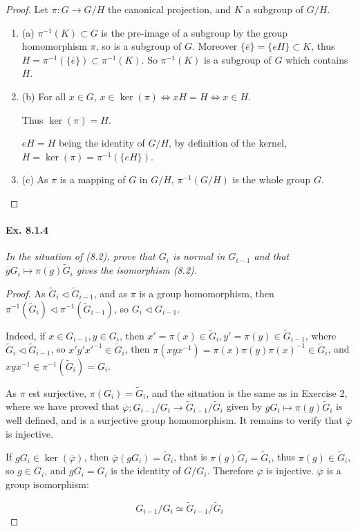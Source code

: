 \documentclass[11pt,a4paper]{article}
\newcommand{\be} {\begin{enumerate}}
\newcommand{\ee} {\end{enumerate}}
\begin{document}
\begin{proof}
Let $\pi : G \to G/H$ the canonical projection, and $K$ a subgroup of $G/H$.


\be
\item[(a)] $\pi^{-1}(K) \subset G$ is the pre-image of  a subgroup by  the group homomorphism $\pi$, so is a subgroup of $G$.
Moreover $\{\overline{e}\} = \{eH\} \subset K$, thus $H = \pi^{-1}(\{\overline{e}\}) \subset \pi^{-1}(K)$. So $\pi^{-1}(K)$ is a subgroup of $G$ which contains $H$.


\item[(b)] For all $x\in G$, $x \in \ker(\pi) \iff xH = H \iff x \in H$.

Thus $\ker(\pi) = H$.

$eH=H$ being the identity of $G/H$, by definition of the kernel, $H = \ker(\pi) = \pi^{-1}(\{eH\})$.

\item[(c)] As $\pi$ is a mapping of $G$ in $G/H$, $\pi^{-1}(G/H)$ is the whole group $G$.
\ee
\end{proof}

\paragraph{Ex. 8.1.4}

{\it In the situation of (8.2), prove that $G_i$ is normal in $G_{i-1}$ and that ${gG_i \mapsto \pi(g) \tilde{G}_i}$ gives the isomorphism (8.2).
}

\begin{proof}
As $\tilde{G}_i \lhd \tilde{G}_{i-1}$, and as $\pi$ is a group homomorphism, then  $\pi^{-1} (\tilde{G}_i) \lhd \pi^{-1} (\tilde{G}_{i-1})$, so $G_{i} \lhd G_{i-1}$.

Indeed, if $x \in G_{i-1}, y \in G_{i}$, then $x' = \pi(x) \in \tilde{G}_i,y' =\pi(y) \in \tilde{G}_{i-1}$, where $\tilde{G}_i \lhd \tilde{G}_{i-1}$, so $x' y' x'^{-1} \in \tilde{G}_i$, 
then $\pi(xyx^{-1}) = \pi(x) \pi(y) \pi(x)^{-1} \in \tilde{G}_{i}$, and $xyx^{-1} \in \pi^{-1}(\tilde{G}_i) = G_i$.


As $\pi$ est surjective, $\pi(G_i) = \tilde{G}_i$, and the situation is the same as in Exercise 2, where we have proved that $\overline{\varphi} : G_{i-1}/G_{i} \to \tilde G_{i-1}/ \tilde G_{i}$ given by $gG_i \mapsto \pi(g) \tilde{G}_i$ is well defined, and is a surjective group homomorphism. It remains to verify that $\overline{\varphi}$ is injective.

If $g G_i \in \ker(\overline{\varphi})$, then $\overline{\varphi}(gG_i) = \tilde G_i$, that is $\pi(g) \tilde G_i = \tilde G_i$, thus $\pi(g) \in \tilde G_i$, so  $g \in G_i$, and $gG_i =G_i$ is the identity of $G/G_i$. Therefore $\overline{\varphi}$ is injective. $\overline{\varphi}$ is a group isomorphism:

$$ G_{i-1}/G_{i} \simeq \tilde G_{i-1}/ \tilde G_{i}$$
\end{proof}
\end{document}
